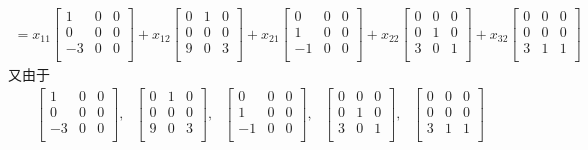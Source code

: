 \documentclass[11pt,a4paper,openany,oneside]{book}
\begin{document}
\begin{gather*}
=x_{11}
\begin{bmatrix}
1 &  0  &  0  \\
0 &  0  &  0  \\
-3 &  0  &  0  \\
\end{bmatrix}
+x_{12}
\begin{bmatrix}
0 &  1  &  0  \\
0 &  0  &  0  \\
9 &  0  &  3  \\
\end{bmatrix}
+x_{21}
\begin{bmatrix}
0 &  0  &  0  \\
1 &  0  &  0  \\
-1&  0  &  0  \\
\end{bmatrix}
+x_{22}
\begin{bmatrix}
0 &  0  &  0  \\
0 &  1  &  0  \\
3 &  0  &  1  \\
\end{bmatrix}
+x_{32}
\begin{bmatrix}
0 &  0  &  0  \\
0 &  0  &  0  \\
3 &  1  &  1  \\
\end{bmatrix}
\end{gather*}
又由于
\begin{gather*}
\begin{bmatrix}
1 &  0  &  0  \\
0 &  0  &  0  \\
-3 &  0  &  0  \\
\end{bmatrix},
\ \ \ 
\begin{bmatrix}
0 &  1  &  0  \\
0 &  0  &  0  \\
9 &  0  &  3  \\
\end{bmatrix},
\ \ \ 
\begin{bmatrix}
0 &  0  &  0  \\
1 &  0  &  0  \\
-1&  0  &  0  \\
\end{bmatrix},
\ \ \ 
\begin{bmatrix}
0 &  0  &  0  \\
0 &  1  &  0  \\
3 &  0  &  1  \\
\end{bmatrix},
\ \ \ 
\begin{bmatrix}
0 &  0  &  0  \\
0 &  0  &  0  \\
3 &  1  &  1  \\
\end{bmatrix}
\end{gather*}
\end{document}
